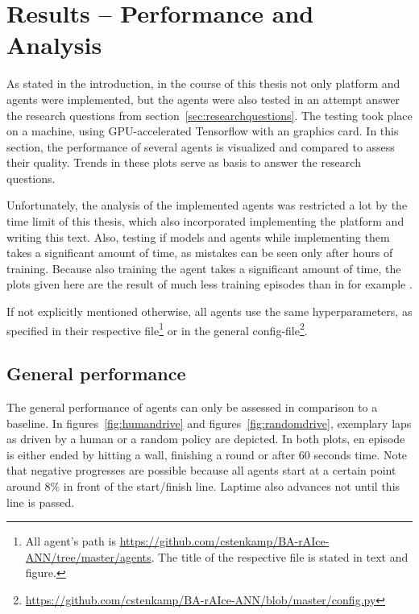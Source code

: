 \chapter{Results -- Performance and Analysis}
\label{ch:resultsanalysis}

As stated in the introduction, in the course of this thesis not only platform and agents were implemented, but the agents were also tested in an attempt answer the research questions from section~\ref{sec:researchquestions}. The testing took place on a  machine, using GPU-accelerated Tensorflow with an  graphics card. In this section, the performance of several agents is visualized and compared to assess their quality. Trends in these plots serve as basis to answer the research questions. 

Unfortunately, the analysis of the implemented agents was restricted a lot by the time limit of this thesis, which also incorporated implementing the platform and writing this text. Also, testing if models and agents while implementing them takes a significant amount of time, as mistakes can be seen only after hours of training. Because also training the agent takes a significant amount of time, the plots given here are the result of much less training episodes than in for example \cite{mnih_human-level_2015}.

If not explicitly mentioned otherwise, all agents use the same hyperparameters, as specified in their respective file\footnote{All agent's path is \url{https://github.com/cstenkamp/BA-rAIce-ANN/tree/master/agents}. The title of the respective file is stated in text and figure.} or in the general config-file\footnote{\url{https://github.com/cstenkamp/BA-rAIce-ANN/blob/master/config.py}}.


\section{General performance}

The general performance of agents can only be assessed in comparison to a baseline. In figures~\ref{fig:humandrive} and figures~\ref{fig:randomdrive}, exemplary laps as driven by a human or a random policy are depicted. In both plots, en episode is either ended by hitting a wall, finishing a round or after 60 seconds time. Note that negative progresses are possible because all agents start at a certain point around $8\%$ in front of the start/finish line. Laptime also advances not until this line is passed.

